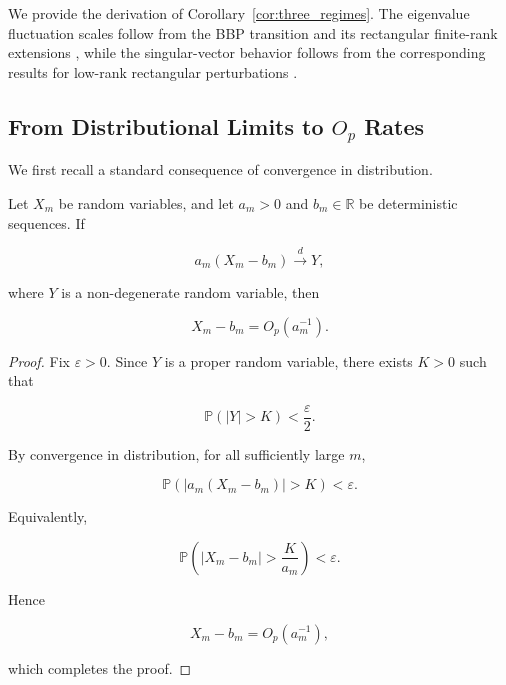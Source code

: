 We provide the derivation of Corollary~\ref{cor:three_regimes}.
The eigenvalue fluctuation scales follow from the BBP transition
\cite{baik2005phase} and its rectangular finite-rank extensions
\cite{benaych2012singular,ding2020high}, while the singular-vector
behavior follows from the corresponding results for low-rank rectangular
perturbations \cite{benaych2012singular,ding2020high}.


\subsection{From Distributional Limits to $O_p$ Rates}

We first recall a standard consequence of convergence in distribution.

\begin{lemma}
\label{lem:dist_to_op}
Let $X_m$ be random variables, and let $a_m>0$ and
$b_m\in\mathbb{R}$ be deterministic sequences. If

\begin{equation}
a_m(X_m-b_m)
\xrightarrow{d}
Y,
\end{equation}

where $Y$ is a non-degenerate random variable, then

\begin{equation}
X_m-b_m
=
O_p(a_m^{-1}).
\end{equation}
\end{lemma}

\begin{proof}
Fix $\varepsilon>0$. Since $Y$ is a proper random variable, there exists
$K>0$ such that

\begin{equation}
\mathbb{P}(|Y|>K)
<
\frac{\varepsilon}{2}.
\end{equation}

By convergence in distribution, for all sufficiently large $m$,

\begin{equation}
\mathbb{P}
\left(
|a_m(X_m-b_m)|>K
\right)
<
\varepsilon.
\end{equation}

Equivalently,

\begin{equation}
\mathbb{P}
\left(
|X_m-b_m|>\frac{K}{a_m}
\right)
<
\varepsilon.
\end{equation}

Hence

\begin{equation}
X_m-b_m
=
O_p(a_m^{-1}),
\end{equation}

which completes the proof.
\end{proof}


